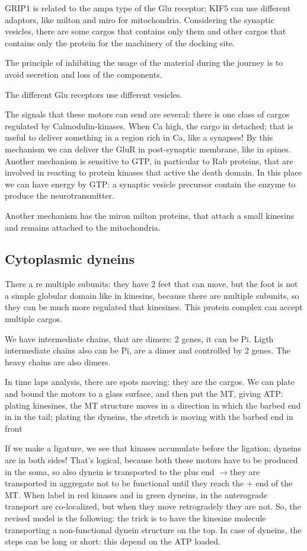 \documentclass[a4paper, 12pt]{book}
\newcommand{\lfreccia}{\ensuremath{\longrightarrow}}
\begin{document}
GRIP1 is related to the ampa type of the Glu receptor; KIF5 can use different adaptors, like milton and miro for mitochondria. Considering the synaptic vesicles, there are some cargos that contains only them and other cargos that contains only the protein for the machinery of the docking site. 

The principle of inhibiting the usage of the material during the journey is to avoid secretion and loss of the components. 

The different Glu receptors use different vesicles. 

The signals that these motors can send are several: there is one class of cargos regulated by Calmodulin-kinases. When Ca high, the cargo in detached; that is useful to deliver something in a region rich in Ca, like a synapses! By this mechanism we can deliver the GluR in post-synaptic membrane, like in spines. Another mechanism is sensitive to GTP, in particular to Rab proteins, that are involved in reacting to protein kinases that active the death domain. In this place we can have energy by GTP: a synaptic vesicle precursor contain the enzyme to produce the neurotransmitter.

Another mechanism has the miron milton proteins, that attach a small kinesins and remains attached to the mitochondria.

\subsection{Cytoplasmic dyneins}
There a re multiple subunits: they have 2 feet that can move, but the foot is not a simple globular domain like in kinesins, because there are multiple subunits, so they can be much more regulated that kinesines. This protein complex can accept multiple cargos.

We have intermediate chains, that are dimers: 2 genes, it can be Pi. Ligth intermediate chains also can be Pi, are a dimer and controlled by 2 genes. The heavy chains are also dimers.

In time laps analysis, there are spots moving: they are the cargos. We can plate and bound the motors to a glass surface, and then put the MT, giving ATP: plating kinesines, the MT structure moves in a direction in which the barbed end in in the tail; plating the dyneins, the stretch is moving with the barbed end in front

If we make a ligature, we see that kinases accumulate before the ligation; dyneins are in both sides! That's logical, because both these motors have to be produced in the soma, so also dynein is transported to the plus end \lfreccia they are transported in aggregate not to be functional until they reach the + end of the MT. When label in red kinases and in green dyneins, in the anterograde transport are co-localized, but when they move retrogradely they are not. So, the revised model is the following: the trick is to have the kinesine molecule transporting a non-functional dynein structure on the top. In case of dyneins, the steps can be long or short: this depend on the ATP loaded.
\end{document}

